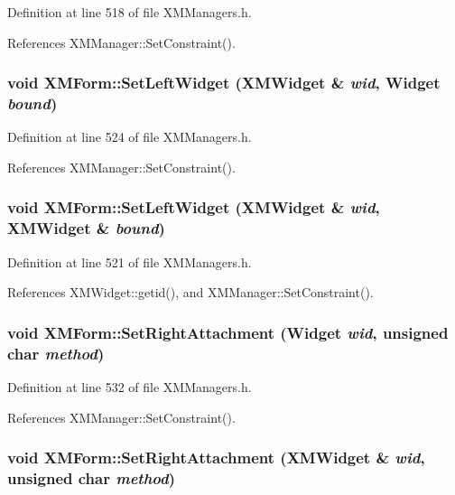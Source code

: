 Definition at line 518 of file XMManagers.h.

References XMManager::Set\-Constraint().
\subsubsection{\setlength{\rightskip}{0pt plus 5cm}void XMForm::Set\-Left\-Widget ({\bf XMWidget} \& {\em wid}, Widget {\em bound})\hspace{0.3cm}{\tt  [inline]}}\label{classXMForm_a20}




Definition at line 524 of file XMManagers.h.

References XMManager::Set\-Constraint().
\subsubsection{\setlength{\rightskip}{0pt plus 5cm}void XMForm::Set\-Left\-Widget ({\bf XMWidget} \& {\em wid}, {\bf XMWidget} \& {\em bound})\hspace{0.3cm}{\tt  [inline]}}\label{classXMForm_a19}




Definition at line 521 of file XMManagers.h.

References XMWidget::getid(), and XMManager::Set\-Constraint().
\subsubsection{\setlength{\rightskip}{0pt plus 5cm}void XMForm::Set\-Right\-Attachment (Widget {\em wid}, unsigned char {\em method})\hspace{0.3cm}{\tt  [inline]}}\label{classXMForm_a22}




Definition at line 532 of file XMManagers.h.

References XMManager::Set\-Constraint().
\subsubsection{\setlength{\rightskip}{0pt plus 5cm}void XMForm::Set\-Right\-Attachment ({\bf XMWidget} \& {\em wid}, unsigned char {\em method})\hspace{0.3cm}{\tt  [inline]}}\label{classXMForm_a21}




